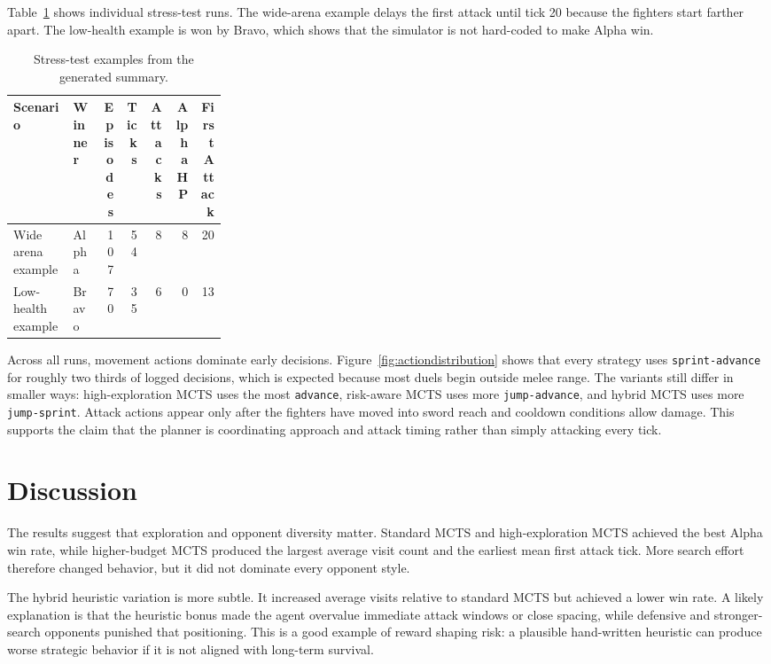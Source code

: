 \documentclass[11pt]{article}
\begin{document}
Table~\ref{tab:examples} shows individual stress-test runs. The wide-arena example delays the first attack until tick 20 because the fighters start farther apart. The low-health example is won by Bravo, which shows that the simulator is not hard-coded to make Alpha win.

\begin{table}[h]
\centering
\caption{Stress-test examples from the generated summary.}
\label{tab:examples}
\small
\begin{tabular}{p{0.28\linewidth}lrrrrr}
\toprule
Scenario & Winner & Episodes & Ticks & Attacks & Alpha HP & First Attack \\
\midrule
Wide arena example & Alpha & 107 & 54 & 8 & 8 & 20 \\
Low-health example & Bravo & 70 & 35 & 6 & 0 & 13 \\
\bottomrule
\end{tabular}
\end{table}

Across all runs, movement actions dominate early decisions. Figure~\ref{fig:actiondistribution} shows that every strategy uses \texttt{sprint-advance} for roughly two thirds of logged decisions, which is expected because most duels begin outside melee range. The variants still differ in smaller ways: high-exploration MCTS uses the most \texttt{advance}, risk-aware MCTS uses more \texttt{jump-advance}, and hybrid MCTS uses more \texttt{jump-sprint}. Attack actions appear only after the fighters have moved into sword reach and cooldown conditions allow damage. This supports the claim that the planner is coordinating approach and attack timing rather than simply attacking every tick.

\section{Discussion}

The results suggest that exploration and opponent diversity matter. Standard MCTS and high-exploration MCTS achieved the best Alpha win rate, while higher-budget MCTS produced the largest average visit count and the earliest mean first attack tick. More search effort therefore changed behavior, but it did not dominate every opponent style.

The hybrid heuristic variation is more subtle. It increased average visits relative to standard MCTS but achieved a lower win rate. A likely explanation is that the heuristic bonus made the agent overvalue immediate attack windows or close spacing, while defensive and stronger-search opponents punished that positioning. This is a good example of reward shaping risk: a plausible hand-written heuristic can produce worse strategic behavior if it is not aligned with long-term survival.
\end{document}
